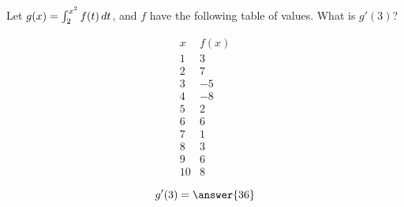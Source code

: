 \documentclass{ximera}
\author{Steven Gubkin}
\begin{document}
\begin{exercise}

Let $g(x) = \int_2^{x^2} f(t) \mathop{}\!d t$, and $f$ have the following table
of values.  What is $g'(3)$?

\[
\begin{array}{c|c}
 x & f(x) \\ \hline
1 & 3 \\
2 & 7 \\
3 & -5\\
4 & -8 \\
5 & 2 \\
6 & 6 \\
7 & 1 \\
8 & 3 \\
9 & 6 \\
10 & 8
\end{array}
\]
\begin{prompt}
  \[
  g'(3) = \answer{36}
  \]
\end{prompt}
\end{exercise}
\end{document}
